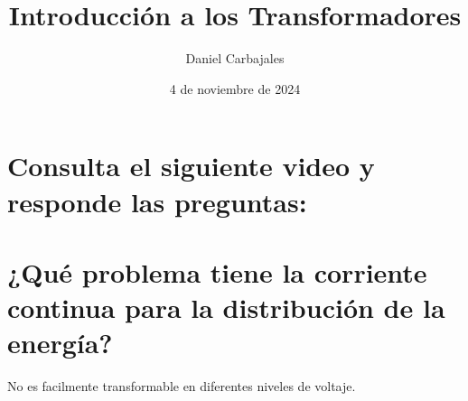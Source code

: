 \documentclass{report}
\title{\Huge{Introducción a los Transformadores}}
\author{\large{Daniel Carbajales}}
\date{4 de noviembre de 2024}
\begin{document}

\newpage
\Large{\section*{Consulta el siguiente video y responde las preguntas:}\label{chapter:1}}
\setcounter{chapter}{1}
\vspace{1em}
\section{¿Qué problema tiene la corriente continua para la distribución de la energía?}
No es facilmente transformable en diferentes niveles de voltaje.
\end{document}
